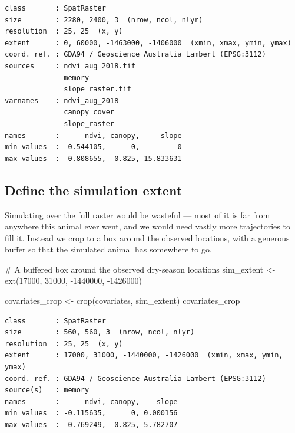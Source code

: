 \documentclass[
  letterpaper,
  DIV=11,
  numbers=noendperiod]{scrartcl}
\newenvironment{Shaded}{\begin{snugshade}}{\end{snugshade}}
\newcommand{\CommentTok}[1]{\textcolor[rgb]{0.37,0.37,0.37}{#1}}
\newcommand{\DecValTok}[1]{\textcolor[rgb]{0.68,0.00,0.00}{#1}}
\newcommand{\FunctionTok}[1]{\textcolor[rgb]{0.28,0.35,0.67}{#1}}
\newcommand{\NormalTok}[1]{\textcolor[rgb]{0.00,0.23,0.31}{#1}}
\newcommand{\OtherTok}[1]{\textcolor[rgb]{0.00,0.23,0.31}{#1}}
\newcommand{\SpecialCharTok}[1]{\textcolor[rgb]{0.37,0.37,0.37}{#1}}
\begin{document}
\begin{verbatim}
class       : SpatRaster
size        : 2280, 2400, 3  (nrow, ncol, nlyr)
resolution  : 25, 25  (x, y)
extent      : 0, 60000, -1463000, -1406000  (xmin, xmax, ymin, ymax)
coord. ref. : GDA94 / Geoscience Australia Lambert (EPSG:3112)
sources     : ndvi_aug_2018.tif
              memory
              slope_raster.tif
varnames    : ndvi_aug_2018
              canopy_cover
              slope_raster
names       :      ndvi, canopy,     slope
min values  : -0.544105,      0,         0
max values  :  0.808655,  0.825, 15.833631
\end{verbatim}

\subsection{Define the simulation
extent}\label{define-the-simulation-extent}

Simulating over the full raster would be wasteful --- most of it is far
from anywhere this animal ever went, and we would need vastly more
trajectories to fill it. Instead we crop to a box around the observed
locations, with a generous buffer so that the simulated animal has
somewhere to go.

\begin{Shaded}
\begin{Highlighting}[]
\CommentTok{\# A buffered box around the observed dry{-}season locations}
\NormalTok{sim\_extent }\OtherTok{\textless{}{-}} \FunctionTok{ext}\NormalTok{(}\DecValTok{17000}\NormalTok{, }\DecValTok{31000}\NormalTok{, }\SpecialCharTok{{-}}\DecValTok{1440000}\NormalTok{, }\SpecialCharTok{{-}}\DecValTok{1426000}\NormalTok{)}

\NormalTok{covariates\_crop }\OtherTok{\textless{}{-}} \FunctionTok{crop}\NormalTok{(covariates, sim\_extent)}
\NormalTok{covariates\_crop}
\end{Highlighting}
\end{Shaded}

\begin{verbatim}
class       : SpatRaster
size        : 560, 560, 3  (nrow, ncol, nlyr)
resolution  : 25, 25  (x, y)
extent      : 17000, 31000, -1440000, -1426000  (xmin, xmax, ymin, ymax)
coord. ref. : GDA94 / Geoscience Australia Lambert (EPSG:3112)
source(s)   : memory
names       :      ndvi, canopy,    slope
min values  : -0.115635,      0, 0.000156
max values  :  0.769249,  0.825, 5.782707
\end{verbatim}
\end{document}
